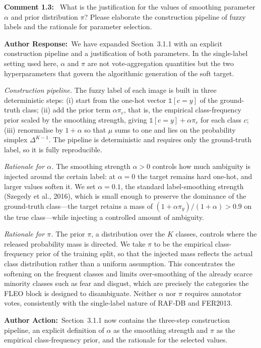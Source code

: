 \documentclass[11pt]{article}
\newcommand{\comment}[1]{\smallskip\noindent\textbf{\color{navy}Comment #1:}\ }
\newcommand{\response}{\smallskip\par\noindent\textbf{\color{steel}Author Response:}\ }
\newcommand{\action}{\smallskip\par\noindent\textbf{\color{steel}Author Action:}\ }
\begin{document}
\comment{1.3} What is the justification for the values of smoothing parameter $\alpha$ and
prior distribution $\pi$? Please elaborate the construction pipeline of fuzzy labels and the
rationale for parameter selection.

\response We have expanded Section~3.1.1 with an explicit construction pipeline and a
justification of both parameters. In the single-label setting used here, $\alpha$ and $\pi$
are not vote-aggregation quantities but the two hyperparameters that govern the algorithmic
generation of the soft target.

\emph{Construction pipeline.} The fuzzy label of each image is built in three deterministic
steps: (i) start from the one-hot vector $\mathbb{1}[c=y]$ of the ground-truth class;
(ii) add the prior term $\alpha\pi_c$, that is, the empirical class-frequency prior scaled by
the smoothing strength, giving $\mathbb{1}[c=y]+\alpha\pi_c$ for each class $c$;
(iii) renormalise by $1+\alpha$ so that $\mu$ sums to one and lies on the probability simplex
$\Delta^{K-1}$. The pipeline is deterministic and requires only the ground-truth label, so it
is fully reproducible.

\emph{Rationale for $\alpha$.} The smoothing strength $\alpha>0$ controls how much ambiguity
is injected around the certain label: at $\alpha=0$ the target remains hard one-hot, and
larger values soften it. We set $\alpha=0.1$, the standard label-smoothing strength
(Szegedy et al., 2016), which is small enough to preserve the dominance of the ground-truth
class---the target retains a mass of $(1+\alpha\pi_y)/(1+\alpha)>0.9$ on the true class---while
injecting a controlled amount of ambiguity.

\emph{Rationale for $\pi$.} The prior $\pi$, a distribution over the $K$ classes, controls
where the released probability mass is directed. We take $\pi$ to be the empirical
class-frequency prior of the training split, so that the injected mass reflects the actual
class distribution rather than a uniform assumption. This concentrates the softening on the
frequent classes and limits over-smoothing of the already scarce minority classes such as
fear and disgust, which are precisely the categories the FLEO block is designed to
disambiguate. Neither $\alpha$ nor $\pi$ requires annotator votes, consistently with the
single-label nature of RAF-DB and FER2013.

\action Section~3.1.1 now contains the three-step construction pipeline, an explicit
definition of $\alpha$ as the smoothing strength and $\pi$ as the empirical class-frequency
prior, and the rationale for the selected values.
\end{document}
